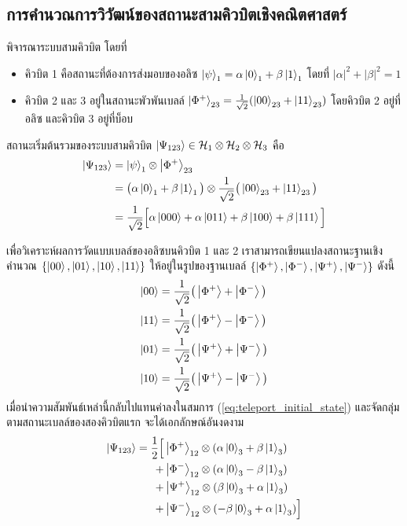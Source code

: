 \subsection{การคำนวณการวิวัฒน์ของสถานะสามคิวบิตเชิงคณิตศาสตร์}
พิจารณาระบบสามคิวบิต โดยที่
\begin{itemize}
    \item คิวบิต 1 คือสถานะที่ต้องการส่งมอบของอลิซ $\ket{\psi}_1 = \alpha\ket{0}_1 + \beta\ket{1}_1$ โดยที่ $|\alpha|^2 + |\beta|^2 = 1$
    \item คิวบิต 2 และ 3 อยู่ในสถานะพัวพันเบลล์ $\ket{\Phi^+}_{23} = \frac{1}{\sqrt{2}}(\ket{00}_{23} + \ket{11}_{23})$ โดยคิวบิต 2 อยู่ที่อลิซ และคิวบิต 3 อยู่ที่บ็อบ
\end{itemize}

สถานะเริ่มต้นรวมของระบบสามคิวบิต $\ket{\Psi_{123}} \in \mathcal{H}_1 \otimes \mathcal{H}_2 \otimes \mathcal{H}_3$ คือ
\begin{align}
\ket{\Psi_{123}} &= \ket{\psi}_1 \otimes \ket{\Phi^+}_{23} \nonumber \\
&= \big( \alpha\ket{0}_1 + \beta\ket{1}_1 \big) \otimes \frac{1}{\sqrt{2}} \big( \ket{00}_{23} + \ket{11}_{23} \big) \nonumber \\
&= \frac{1}{\sqrt{2}} \Big[ \alpha\ket{000} + \alpha\ket{011} + \beta\ket{100} + \beta\ket{111} \Big]
\label{eq:teleport_initial_state}
\end{align}

เพื่อวิเคราะห์ผลการวัดแบบเบลล์ของอลิซบนคิวบิต 1 และ 2 เราสามารถเขียนแปลงสถานะฐานเชิงคำนวณ $\{\ket{00}, \ket{01}, \ket{10}, \ket{11}\}$ ให้อยู่ในรูปของฐานเบลล์ $\{\ket{\Phi^+}, \ket{\Phi^-}, \ket{\Psi^+}, \ket{\Psi^-}\}$ ดังนี้
\begin{align}
\ket{00} &= \frac{1}{\sqrt{2}} \big( \ket{\Phi^+} + \ket{\Phi^-} \big) \\
\ket{11} &= \frac{1}{\sqrt{2}} \big( \ket{\Phi^+} - \ket{\Phi^-} \big) \\
\ket{01} &= \frac{1}{\sqrt{2}} \big( \ket{\Psi^+} + \ket{\Psi^-} \big) \\
\ket{10} &= \frac{1}{\sqrt{2}} \big( \ket{\Psi^+} - \ket{\Psi^-} \big)
\end{align}
เมื่อนำความสัมพันธ์เหล่านี้กลับไปแทนค่าลงในสมการ (\ref{eq:teleport_initial_state}) และจัดกลุ่มตามสถานะเบลล์ของสองคิวบิตแรก จะได้เอกลักษณ์อันงดงาม
\begin{align}
\ket{\Psi_{123}} = \frac{1}{2} \Big[ &\ket{\Phi^+}_{12} \otimes (\alpha\ket{0}_3 + \beta\ket{1}_3) \nonumber \\
+ &\ket{\Phi^-}_{12} \otimes (\alpha\ket{0}_3 - \beta\ket{1}_3) \nonumber \\
+ &\ket{\Psi^+}_{12} \otimes (\beta\ket{0}_3 + \alpha\ket{1}_3) \nonumber \\
+ &\ket{\Psi^-}_{12} \otimes (-\beta\ket{0}_3 + \alpha\ket{1}_3) \Big]
\label{eq:teleport_bell_expansion}
\end{align}

